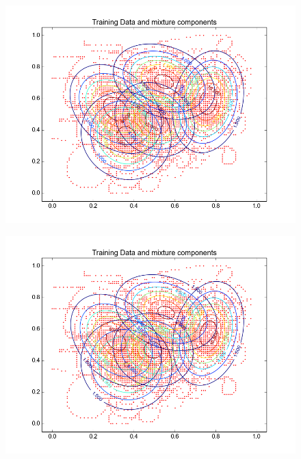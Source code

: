 \documentclass[11pt,a4paper]{article}
\begin{document}
\begin{minipage}[b]{0.25\textwidth}
\begin{figure}[H]
  \centering
  \includegraphics[width=.8\linewidth]{Figures/contours_chA.test10.png}

  \label{fig:sfig1}
\end{figure}%
\end{minipage}
\begin{minipage}[b]{0.25\textwidth}
\begin{figure}[H]
  \centering
  \includegraphics[width=.8\linewidth]{Figures/contours_chA.test15.png}

  \label{fig:sfig1}
\end{figure}%
\end{minipage}
\end{document}
